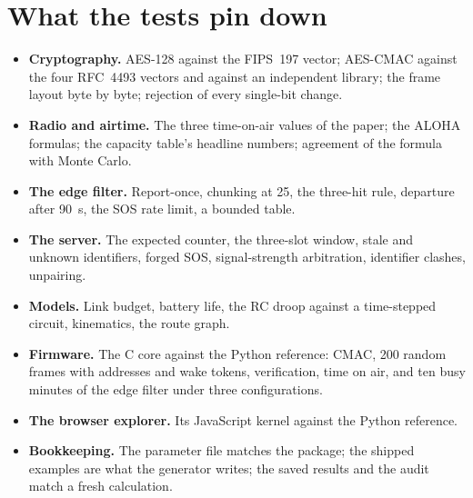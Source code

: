 \documentclass[11pt,a4paper,twoside,openany]{book}
\begin{document}
\chapter{What the tests pin down}
\begin{itemize}
\item \textbf{Cryptography.} AES-128 against the FIPS~197 vector; AES-CMAC against the four RFC~4493 vectors and
against an independent library; the frame layout byte by byte; rejection of every single-bit change.
\item \textbf{Radio and airtime.} The three time-on-air values of the paper; the ALOHA formulas; the capacity table's
headline numbers; agreement of the formula with Monte Carlo.
\item \textbf{The edge filter.} Report-once, chunking at 25, the three-hit rule, departure after 90~s, the SOS rate
limit, a bounded table.
\item \textbf{The server.} The expected counter, the three-slot window, stale and unknown identifiers, forged SOS,
signal-strength arbitration, identifier clashes, unpairing.
\item \textbf{Models.} Link budget, battery life, the RC droop against a time-stepped circuit, kinematics, the route
graph.
\item \textbf{Firmware.} The C core against the Python reference: CMAC, 200 random frames with addresses and wake
tokens, verification, time on air, and ten busy minutes of the edge filter under three configurations.
\item \textbf{The browser explorer.} Its JavaScript kernel against the Python reference.
\item \textbf{Bookkeeping.} The parameter file matches the package; the shipped examples are what the generator
writes; the saved results and the audit match a fresh calculation.
\end{itemize}
\end{document}
